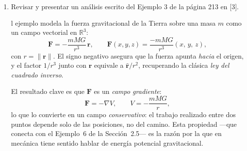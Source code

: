 \begin{enumerate}
\begin{respuesta}[title=P15.8 ]
la regla del producto para la derivada del producto vectorial:
\[
  \frac{d}{dt}\bigl[\boldsymbol{\sigma}(t)\times\mathbf{v}(t)\bigr]
  = \mathbf{v}(t)\times\mathbf{v}(t) + \boldsymbol{\sigma}(t)\times\mathbf{a}(t)
  = \mathbf{0} + \boldsymbol{\sigma}(t)\times\mathbf{a}(t),
\]
donde usamos que $\mathbf{v}\times\mathbf{v}=\mathbf{0}$ siempre.
Multiplicando por $m$ y usando $\mathbf{F}=m\mathbf{a}$:
\[
  \frac{d}{dt}\bigl[m\boldsymbol{\sigma}(t)\times\mathbf{v}(t)\bigr]
  = \boldsymbol{\sigma}(t)\times m\mathbf{a}(t)
  = \boldsymbol{\sigma}(t)\times\mathbf{F}(\boldsymbol{\sigma}(t)).
\]


La cantidad $\mathbf{L}=m\boldsymbol{\sigma}(t)\times\mathbf{v}(t)$ se llama
momento angular y la ecuación que demostramos dice que la tasa de
cambio del momento angular es igual a la torca (o torque)
$\boldsymbol{\sigma}\times\mathbf{F}$.

        \vspace{5cm}
    \end{respuesta}

    \item Revisar y presentar un análisis escrito del Ejemplo 3 de la página 213 en [3].

    \begin{respuesta}[title=P15.9 ]

l ejemplo modela la fuerza gravitacional de la Tierra sobre una masa $m$
como un campo vectorial en $\mathbb{R}^3$:
%
\begin{equation}
    \mathbf{F} = -\frac{mMG}{r^3}\,\mathbf{r},
    \qquad
    \mathbf{F}(x,y,z) = \frac{-mMG}{r^3}(x,\,y,\,z),
\end{equation}
%
con $r = \|\mathbf{r}\|$. El signo negativo asegura que la fuerza apunta
\emph{hacia} el origen, y el factor $1/r^3$ junto con $\mathbf{r}$
equivale a $\hat{\mathbf{r}}/r^2$, recuperando la clásica \emph{ley del
cuadrado inverso}.
 
El resultado clave es que $\mathbf{F}$ es un \emph{campo gradiente}:
%
\begin{equation}
    \mathbf{F} = -\nabla V, \qquad V = -\frac{mMG}{r},
\end{equation}
%
lo que lo convierte en un campo \emph{conservativo}: el trabajo realizado
entre dos puntos depende solo de las posiciones, no del camino. Esta
propiedad —que conecta con el Ejemplo~6 de la Sección~2.5— es la razón
por la que en mecánica tiene sentido hablar de energía potencial
gravitacional.
        \vspace{5cm}
    \end{respuesta}


\end{enumerate}
